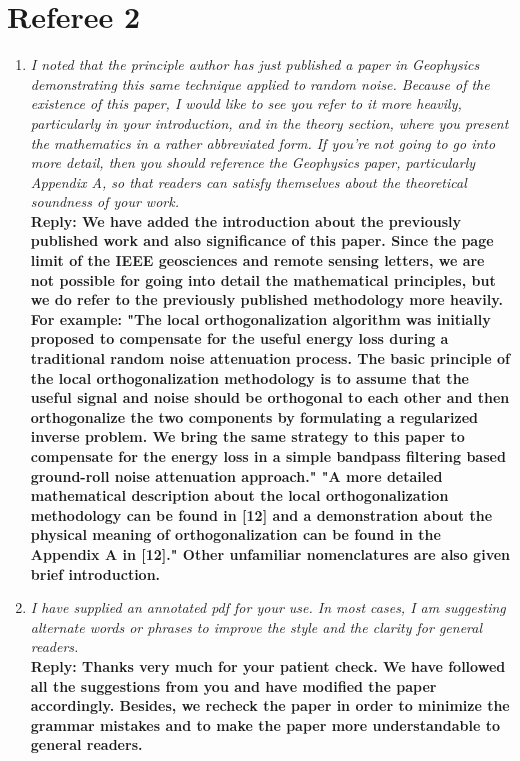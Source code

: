 \section{Referee 2}
\begin{enumerate}
\item\emph{I noted that the principle author has just published a paper in Geophysics demonstrating this same technique applied to random noise. Because of the existence of this paper, I would like to see you refer to it more heavily, particularly in your introduction, and in the theory section, where you present the mathematics in a rather abbreviated form. If you're not going to go into more detail, then you should reference the Geophysics paper, particularly Appendix A, so that readers can satisfy themselves about the theoretical soundness of your work.}\\
\textbf{Reply: We have added the introduction about the previously published work and also significance of this paper. Since the page limit of the IEEE geosciences and remote sensing letters, we are not possible for going into detail the mathematical principles, but we do refer to the previously published methodology more heavily. For example: "The local orthogonalization algorithm was initially proposed to compensate for the useful energy loss during a traditional random noise attenuation process. The basic principle of the local orthogonalization methodology is to assume that the useful signal and noise should be orthogonal to each other and then orthogonalize the two components by formulating a regularized inverse problem. We bring the same strategy to this paper to compensate for the energy loss in a simple bandpass filtering based ground-roll noise attenuation approach." "A more detailed mathematical description about the local orthogonalization methodology can be found in [12] and a demonstration about the physical meaning of orthogonalization can be found in the Appendix A in [12]." Other unfamiliar nomenclatures are also given brief introduction.}

\item\emph{I have supplied an annotated pdf for your use. In most cases, I am suggesting alternate words or phrases to improve the style and the clarity for general readers.}\\
\textbf{Reply:  Thanks very much for your patient check. We have followed all the suggestions from you and have modified the paper accordingly. Besides, we recheck the paper in order to minimize the grammar mistakes and to make the paper more understandable to general readers. }


\end{enumerate}
